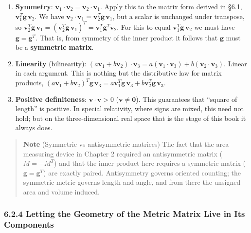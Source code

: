 \begin{enumerate}
\def\labelenumi{\arabic{enumi}.}
\item
  \textbf{Symmetry}:
  \(\mathbf{v}_1 \cdot \mathbf{v}_2 = \mathbf{v}_2 \cdot \mathbf{v}_1\).
  Apply this to the matrix form derived in §6.1,
  \(\mathbf{v}_1^T \mathbf{g} \,\mathbf{v}_2\). We have
  \(\mathbf{v}_2 \cdot \mathbf{v}_1 = \mathbf{v}_2^T \mathbf{g} \,\mathbf{v}_1\),
  but a scalar is unchanged under transpose, so
  \(\mathbf{v}_2^T \mathbf{g} \,\mathbf{v}_1 = (\mathbf{v}_2^T \mathbf{g} \,\mathbf{v}_1)^T = \mathbf{v}_1^T \mathbf{g}^T \mathbf{v}_2\).
  For this to equal \(\mathbf{v}_1^T \mathbf{g} \,\mathbf{v}_2\) we must
  have \(\mathbf{g} = \mathbf{g}^T\). That is, from symmetry of the
  inner product it follows that \(\mathbf{g}\) must be a
  \textbf{symmetric matrix}.
\item
  \textbf{Linearity} (bilinearity):
  \((a\mathbf{v}_1 + b\mathbf{v}_2) \cdot \mathbf{v}_3 = a(\mathbf{v}_1 \cdot \mathbf{v}_3) + b(\mathbf{v}_2 \cdot \mathbf{v}_3)\).
  Linear in each argument. This is nothing but the distributive law for
  matrix products,
  \((a\mathbf{v}_1 + b\mathbf{v}_2)^T \mathbf{g} \,\mathbf{v}_3 = a\mathbf{v}_1^T \mathbf{g} \,\mathbf{v}_3 + b\mathbf{v}_2^T \mathbf{g} \,\mathbf{v}_3\).
\item
  \textbf{Positive definiteness}: \(\mathbf{v} \cdot \mathbf{v} > 0\)
  (\(\mathbf{v} \neq \mathbf{0}\)). This guarantees that ``square of
  length'' is positive. In special relativity, where signs are mixed,
  this need not hold; but on the three-dimensional real space that is
  the stage of this book it always does.
\end{enumerate}

\begin{quote}
\textbf{Note} (Symmetric vs antisymmetric matrices) The fact that the
area-measuring device in Chapter 2 required an antisymmetric matrix
(\(M = -M^T\)) and that the inner product here requires a symmetric
matrix (\(\mathbf{g} = \mathbf{g}^T\)) are exactly paired. Antisymmetry
governs oriented counting; the symmetric metric governs length and
angle, and from there the unsigned area and volume induced.
\end{quote}

\hypertarget{letting-the-geometry-of-the-metric-matrix-live-in-its-components}{%
\subsubsection{6.2.4 Letting the Geometry of the Metric Matrix Live in
Its
Components}\label{letting-the-geometry-of-the-metric-matrix-live-in-its-components}}

